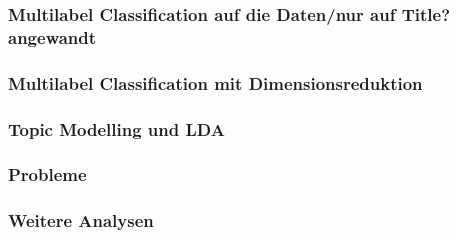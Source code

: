 \documentclass[12pt, xcolor=table]{beamer}
\begin{document}
\begin{frame}
	\frametitle{Multilabel Classification auf die Daten/nur auf Title? angewandt}
\end{frame}

\begin{frame}
	\frametitle{Multilabel Classification mit Dimensionsreduktion}
\end{frame}

\begin{frame}
    \frametitle{Topic Modelling und LDA}
\end{frame}

\begin{frame}
	\frametitle{Probleme}
\end{frame}

\begin{frame}
	\frametitle{Weitere Analysen}
\end{frame}
\end{document}
